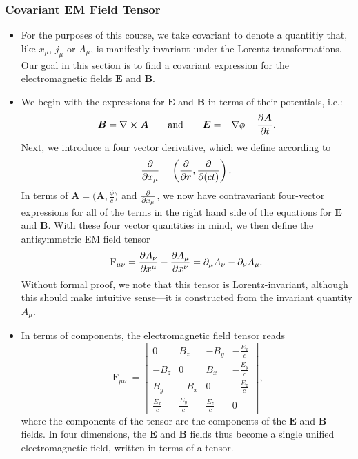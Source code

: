 \documentclass[11pt, a4paper]{article}
\newcommand{\eqtext}[1]{\qquad \text{#1} \qquad}
\renewcommand{\vec}[1]{\bm{#1}} %
\renewcommand{\r}{\vec{r}}
\newcommand{\E}{\vec{E}} %
\newcommand{\B}{\vec{B}} %
\newcommand{\A}{\vec{A}} %
\renewcommand{\curl}{\nabla \cross}
\renewcommand{\grad}{\nabla}
\begin{document}
\subsubsection{Covariant EM Field Tensor}
\begin{itemize}
	\item For the purposes of this course, we take covariant to denote a quantitiy that, like $ x_{\mu} $, $ j_{\mu} $ or $ A_{\mu} $, is manifestly invariant under the Lorentz transformations. Our goal in this section is to find a covariant expression for the electromagnetic fields $ \E $ and $ \B $.
	
	\item We begin with the expressions for $ \E $ and $ \B $ in terms of their potentials, i.e.:
	\begin{equation*}
		\B = \curl \A \eqtext{and} \E = - \grad \phi - \pdv{\A}{t}.
	\end{equation*}
    Next, we introduce a four vector derivative, which we define according to
	\begin{equation*}
		\pdv{x_{\mu}} = \left(\pdv{\r}, \pdv{(ct)} \right).
	\end{equation*}
    In terms of $ \A = \big( \A, \tfrac{\phi}{c} \big) $ and $ \pdv{x_{\mu}} $, we now have contravariant four-vector expressions for all of the terms in the right hand side of the equations for $ \E $ and $ \B $. With these four vector quantities in mind, we then define the antisymmetric EM field tensor
	\begin{equation*}
        \operatorname{F}_{\mu \nu} = \pdv{A_{\nu}}{x^{\mu}} - \pdv{A_{\mu}}{x^{\nu}} = \partial_{\mu}A_{\nu} - \partial_{\nu}A_{\mu}.
	\end{equation*}
	Without formal proof, we note that this tensor is Lorentz-invariant, although this should make intuitive sense---it is constructed from the invariant quantity $ A_{\mu} $.
	
	\item In terms of components, the electromagnetic field tensor reads
	\begin{equation*}
		\operatorname{F}_{\mu\nu} = 
	\begin{bmatrix}
        0 & B_{z} & - B_{y} & -\frac{E_{x}}{c}\\[1mm]
		- B_{z} & 0 & B_{x} & -\frac{E_{y}}{c}\\[1mm]
		B_{y} & -B_{x} & 0 & -\frac{E_{z}}{c}\\
		\frac{E_{x}}{c} & \frac{E_{y}}{c} & \frac{E_{z}}{c} & 0
	\end{bmatrix},
	\end{equation*}
	where the components of the tensor are the components of the $ \E $ and $ \B $ fields. In four dimensions, the $ \E $ and $ \B $ fields thus become a single unified electromagnetic field, written in terms of a tensor.
	

\end{itemize}
\end{document}
